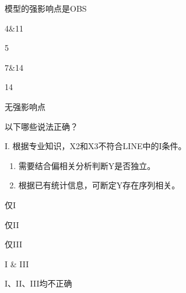 \par\addvspace{6pt}\noindent\begin{minipage}{\linewidth}


模型的强影响点是OBS


\begin{choices}

\item 4\&11

\item 5

\item 7\&14

\item 14

\item 无强影响点

\end{choices}

\end{minipage}\par\vspace{4pt}

\par\addvspace{6pt}\noindent\begin{minipage}{\linewidth}


以下哪些说法正确？

I. 根据专业知识，X2和X3不符合LINE中的I条件。

\begin{enumerate}
\def\labelenumi{\Roman{enumi}.}
\setcounter{enumi}{1}
\item
  需要结合偏相关分析判断Y是否独立。
\item
  根据已有统计信息，可断定Y存在序列相关。
\end{enumerate}


\begin{choices}

\item 仅I

\item 仅II

\item 仅III

\item I \& III

\item I、II、III均不正确

\end{choices}

\end{minipage}\par\vspace{4pt}

